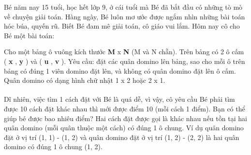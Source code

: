Bé năm nay 15 tuổi, học hết lớp 9, ở cái tuổi mà Bé đã bắt đầu có những tò mò về chuyện giải toán. Hàng ngày, Bé luôn mơ ước được ngắm nhìn những bài toán hóc búa, quyến rũ. Biết Bé đam mê giải toán, cô giáo vui lắm. Hôm nay cô cho Bé một bài toán:  

   Cho một bảng ô vuông kích thước   \textbf{    M   }   x   \textbf{    N   }   (M và N chẵn). Trên bảng có 2 ô cấm (   \textbf{    x   }   ,   \textbf{    y   }   ) và (   \textbf{    u   }   ,   \textbf{    v   }   ). Yêu cầu: đặt các quân domino lên bảng, sao cho mỗi ô trên bảng có đúng 1 viên domino đặt lên, và không có quân domino đặt lên ô cấm. Quân domino có dạng hình chữ nhật 1 x 2 hoặc 2 x 1.   
\\
\\   Dĩ nhiên, việc tìm 1 cách đặt với Bé là quá dễ, vì vậy, cô yêu cầu Bé phải tìm được 10 cách đặt khác nhau thì mới được điểm 10 (mỗi cách 1 điểm). Bạn có thể giúp bé được bao nhiêu điểm? Hai cách đặt được gọi là khác nhau nếu tồn tại hai quân domino (mỗi quân thuộc một cách) có đúng 1 ô chung. Ví dụ quân domino đặt ở vị trí (1, 1) - (1, 2) và quân domino đặt ở vị trí (1, 2) - (2, 2) là hai quân domino có đúng 1 ô chung (1, 2).